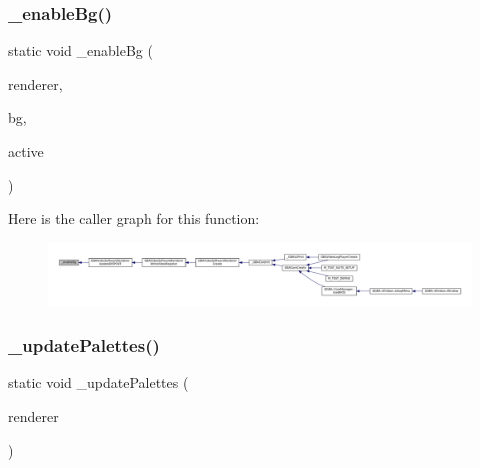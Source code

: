 \subsubsection{\texorpdfstring{\+\_\+enable\+Bg()}{\_enableBg()}}
{\footnotesize\ttfamily static void \+\_\+enable\+Bg (\begin{DoxyParamCaption}\item[{struct G\+B\+A\+Video\+Software\+Renderer $\ast$}]{renderer,  }\item[{\mbox{\hyperlink{ioapi_8h_a787fa3cf048117ba7123753c1e74fcd6}{int}}}]{bg,  }\item[{\mbox{\hyperlink{libretro_8h_a4a26dcae73fb7e1528214a068aca317e}{bool}}}]{active }\end{DoxyParamCaption})\hspace{0.3cm}{\ttfamily [static]}}

Here is the caller graph for this function\+:
\nopagebreak
\begin{figure}[H]
\begin{center}
\leavevmode
\includegraphics[width=350pt]{video-software_8c_af16bb0ab0d2ab6f5aa0ce3a57c1fd43b_icgraph}
\end{center}
\end{figure}
\mbox{\label{video-software_8c_afacc87d619eca46b04d8996790e302ef}} 
\subsubsection{\texorpdfstring{\+\_\+update\+Palettes()}{\_updatePalettes()}}
{\footnotesize\ttfamily static void \+\_\+update\+Palettes (\begin{DoxyParamCaption}\item[{struct G\+B\+A\+Video\+Software\+Renderer $\ast$}]{renderer }\end{DoxyParamCaption})\hspace{0.3cm}{\ttfamily [static]}}


